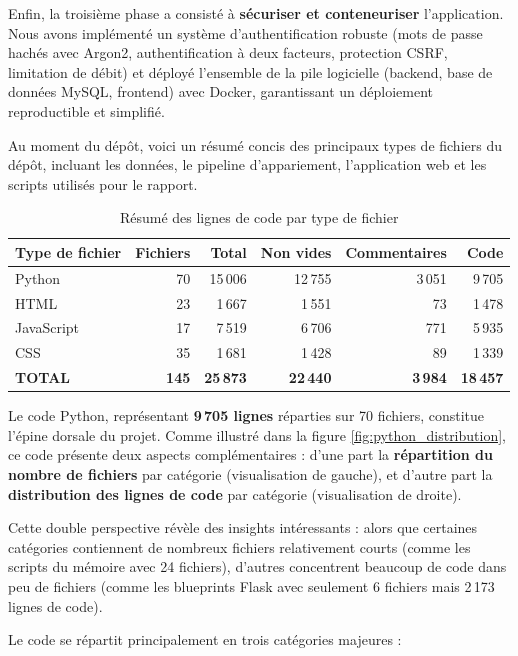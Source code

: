 Enfin, la troisième phase a consisté à \textbf{sécuriser et conteneuriser} l'application. Nous avons implémenté un système d'authentification robuste (mots de passe hachés avec Argon2, authentification à deux facteurs, protection CSRF, limitation de débit) et déployé l'ensemble de la pile logicielle (backend, base de données MySQL, frontend) avec Docker, garantissant un déploiement reproductible et simplifié.

Au moment du dépôt, voici un résumé concis des principaux types de fichiers du dépôt, incluant les données, le pipeline d'appariement, l'application web et les scripts utilisés pour le rapport.

\begin{table}[h]
\centering
\caption{Résumé des lignes de code par type de fichier}
\label{tab:code_summary}
\begin{tabular}{|l|r|r|r|r|r|}
\hline
\textbf{Type de fichier} & \textbf{Fichiers} & \textbf{Total} & \textbf{Non vides} & \textbf{Commentaires} & \textbf{Code} \\
\hline
Python & 70 & 15\,006 & 12\,755 & 3\,051 & 9\,705 \\
HTML & 23 & 1\,667 & 1\,551 & 73 & 1\,478 \\
JavaScript & 17 & 7\,519 & 6\,706 & 771 & 5\,935 \\
CSS & 35 & 1\,681 & 1\,428 & 89 & 1\,339 \\
\hline
\textbf{TOTAL} & \textbf{145} & \textbf{25\,873} & \textbf{22\,440} & \textbf{3\,984} & \textbf{18\,457} \\
\hline
\end{tabular}
\end{table}

Le code Python, représentant \textbf{9\,705 lignes} réparties sur 70 fichiers, constitue l'épine dorsale du projet. Comme illustré dans la figure \ref{fig:python_distribution}, ce code présente deux aspects complémentaires : d'une part la \textbf{répartition du nombre de fichiers} par catégorie (visualisation de gauche), et d'autre part la \textbf{distribution des lignes de code} par catégorie (visualisation de droite).

Cette double perspective révèle des insights intéressants : alors que certaines catégories contiennent de nombreux fichiers relativement courts (comme les scripts du mémoire avec 24 fichiers), d'autres concentrent beaucoup de code dans peu de fichiers (comme les blueprints Flask avec seulement 6 fichiers mais 2\,173 lignes de code).

Le code se répartit principalement en trois catégories majeures :

